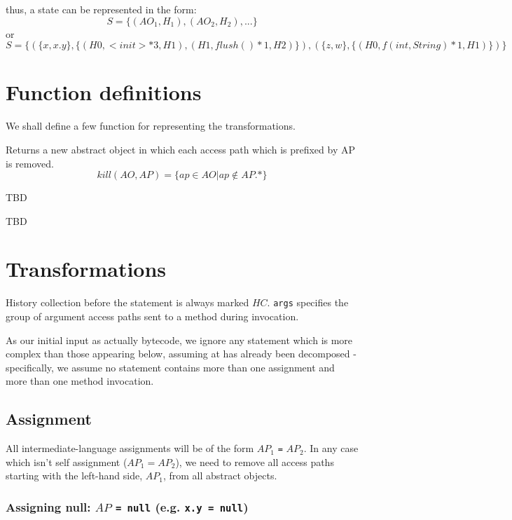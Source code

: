 \documentclass{article}
\begin{document}
thus, a state can be represented in the form:
$$S = \{(AO_1,H_1), (AO_2, H_2), ...\}$$
or
$$S = \{(\{x,x.y\}, \{(H0, <init>*3, H1), (H1, flush()*1, H2)\}), (\{z,w\}, \{(H0, f(int,String)*1, H1)\}) \}$$

\section{Function definitions}

We shall define a few function for representing the transformations.
\begin{description}
	\label{sec:func_defs}
	\item[$kill(AO,AP)$] Returns a new abstract object in which each access path which is prefixed by AP is removed.
	$$ kill(AO,AP) = \{ap \in AO | ap \notin AP.* \} $$
	\item[$extend(H, <method\ signature>)$] TBD
	\item[$type(args)$] TBD
\end{description}

\section{Transformations}
History collection before the statement is always marked $HC$. \texttt{args} specifies the group of argument access paths sent to a method during invocation.

As our initial input as actually bytecode, we ignore any statement which is more complex than those appearing below, assuming at has already been decomposed - specifically, we assume no statement contains more than one assignment and more than one method invocation.

\subsection{Assignment}

All intermediate-language assignments will be of the form $AP_1$ \texttt{=} $AP_2$. In any case which isn't self assignment ($AP_1 = AP_2$), we need to remove all access paths starting with the left-hand side, $AP_1$, from all abstract objects.

\subsubsection{Assigning null: $AP$ \texttt{= null} (e.g. \texttt{x.y = null})}
\end{document}
